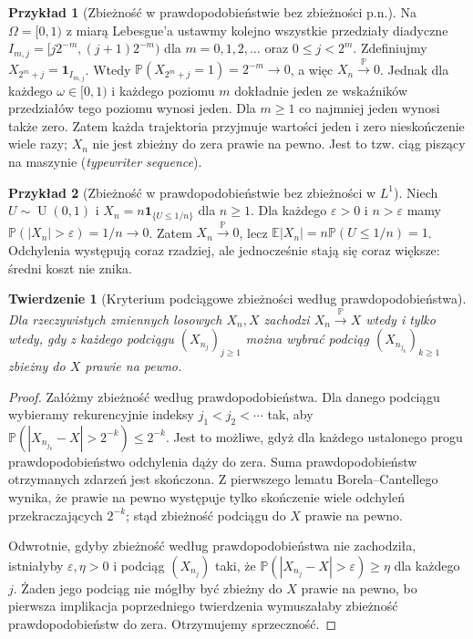 \documentclass[11pt,a4paper,oneside]{report}
\numberwithin{equation}{chapter}
\theoremstyle{plain}
\newtheorem{twierdzenie}{Twierdzenie}[chapter]
\theoremstyle{definition}
\newtheorem{przyklad}{Przykład}[chapter]
\theoremstyle{remark}
\newcommand{\Prob}{\mathbb{P}}
\newcommand{\E}{\mathbb{E}}
\newcommand{\ind}[1]{\mathbf{1}_{#1}}
\newcommand{\Unif}{\operatorname{U}}
\begin{document}
\begin{przyklad}[Zbieżność w prawdopodobieństwie bez zbieżności p.n.]
Na $\Omega=[0,1)$ z miarą Lebesgue'a ustawmy kolejno
wszystkie przedziały diadyczne
$I_{m,j}=[j2^{-m},(j+1)2^{-m})$ dla
$m=0,1,2,\ldots$ oraz $0\leq j<2^m$.
Zdefiniujmy $X_{2^m+j}=\ind{I_{m,j}}$.
Wtedy $\Prob(X_{2^m+j}=1)=2^{-m}\to0$, a więc
$X_n\xrightarrow{\Prob}0$. Jednak dla każdego
$\omega\in[0,1)$ i każdego poziomu $m$ dokładnie
jeden ze wskaźników przedziałów tego poziomu wynosi
jeden. Dla $m\geq1$ co najmniej jeden wynosi także zero.
Zatem każda trajektoria przyjmuje wartości jeden i zero
nieskończenie wiele razy; $X_n$ nie jest zbieżny do zera
prawie na pewno. Jest to tzw. ciąg piszący na maszynie
(\emph{typewriter sequence}).
\end{przyklad}

\begin{przyklad}[Zbieżność w prawdopodobieństwie bez zbieżności w $L^1$]
Niech $U\sim\Unif(0,1)$ i
$X_n=n\ind{\{U\leq1/n\}}$ dla $n\geq1$.
Dla każdego $\varepsilon>0$ i $n>\varepsilon$ mamy
$\Prob(|X_n|>\varepsilon)=1/n\to0$.
Zatem $X_n\xrightarrow{\Prob}0$, lecz
$\E|X_n|=n\Prob(U\leq1/n)=1$.
Odchylenia występują coraz rzadziej, ale jednocześnie
stają się coraz większe: średni koszt nie znika.
\end{przyklad}

\begin{twierdzenie}[Kryterium podciągowe zbieżności według prawdopodobieństwa]
Dla rzeczywistych zmiennych losowych $X_n,X$ zachodzi
$X_n\xrightarrow{\Prob}X$ wtedy i tylko wtedy, gdy
z każdego podciągu $(X_{n_j})_{j\geq1}$ można wybrać
podciąg $(X_{n_{j_k}})_{k\geq1}$ zbieżny do $X$
prawie na pewno.
\end{twierdzenie}
\begin{proof}
Załóżmy zbieżność według prawdopodobieństwa.
Dla danego podciągu wybieramy rekurencyjnie indeksy
$j_1<j_2<\cdots$ tak, aby
$\Prob(|X_{n_{j_k}}-X|>2^{-k})\leq2^{-k}$.
Jest to możliwe, gdyż dla każdego ustalonego progu
prawdopodobieństwo odchylenia dąży do zera.
Suma prawdopodobieństw otrzymanych zdarzeń jest skończona.
Z pierwszego lematu Borela--Cantellego wynika, że
prawie na pewno występuje tylko skończenie wiele
odchyleń przekraczających $2^{-k}$; stąd zbieżność
podciągu do $X$ prawie na pewno.

Odwrotnie, gdyby zbieżność według prawdopodobieństwa
nie zachodziła, istniałyby $\varepsilon,\eta>0$ i
podciąg $(X_{n_j})$ taki, że
$\Prob(|X_{n_j}-X|>\varepsilon)\geq\eta$
dla każdego $j$. Żaden jego podciąg nie mógłby być
zbieżny do $X$ prawie na pewno, bo pierwsza implikacja
poprzedniego twierdzenia wymuszałaby zbieżność
prawdopodobieństw do zera. Otrzymujemy sprzeczność.
\end{proof}
\end{document}
